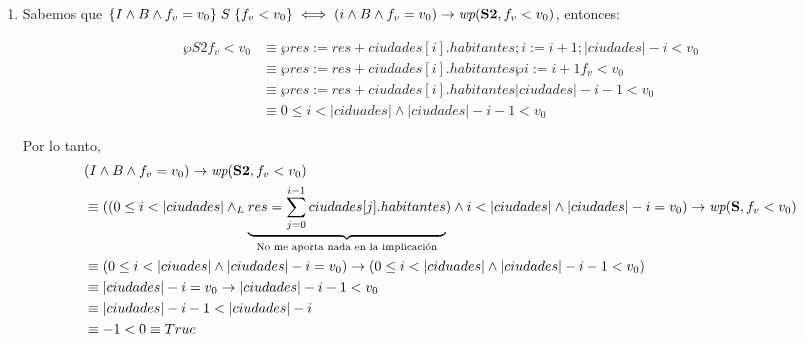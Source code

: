 \documentclass[10pt,a4paper]{article}
\begin{document}
\begin{enumerate}
	\item {}

	      Sabemos que $\hoare{I \land B \land f_v = v_0}{S}{f_v < v_0} \iff (i \land B \land f_v = v_0) \Then \wp{S2}{f_v < v_0}$, entonces:

	      \begin{align*}
		      \wp{S2}{f_v < v_0} & \equiv \wp{res := res + ciudades[i].habitantes; i := i + 1;}{|ciudades| - i < v_0} \\
		                         & \equiv \wp{res := res + ciudades[i].habitantes}{\wp{i := i + 1}{f_v < v_0}}        \\
		                         & \equiv \wp{res := res + ciudades[i].habitantes}{|ciudades| - i - 1 < v_0}          \\
		                         & \equiv 0 \leq i < |ciduades| \land |ciudades| - i - 1 < v_0
	      \end{align*}

	      Por lo tanto,
	      \begin{align*}
		       & (I \land B \land f_v = v_0) \Then \wp{S2}{f_v < v_0}                                                                                                                                                                         \\
		       & \equiv ((0 \leq i < |ciudades| \yLuego \underbrace{res = \sum_{j = 0}^{i - 1} ciudades[j].habitantes}_{\text{No me aporta nada en la implicación}}) \land i < |ciudades| \land |ciudades| - i = v_0) \Then \wp{S}{f_v < v_0} \\
		       & \equiv (0 \leq i < |ciuades| \land |ciudades| - i = v_0) \Then (0 \leq i < |ciduades| \land |ciudades| - i - 1 < v_0)                                                                                                        \\
		       & \equiv |ciudades| - i = v_0 \Then |ciudades| - i - 1 < v_0                                                                                                                                                                   \\
		       & \equiv |ciudades| - i - 1 < |ciudades| - i                                                                                                                                                                                   \\
		       & \equiv -1 < 0 \equiv True
	      \end{align*}


\end{enumerate}
\end{document}
